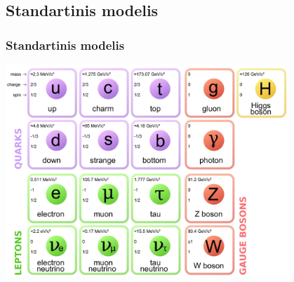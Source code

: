\documentclass[xcolor=dvipsnames]{beamer}
\begin{document}
\begin{frame}
	\section{Standartinis modelis}
	\frametitle{Standartinis modelis}
	\centering
	\includegraphics[width=0.8\textwidth]{SM.jpg}
\end{frame}
\end{document}
